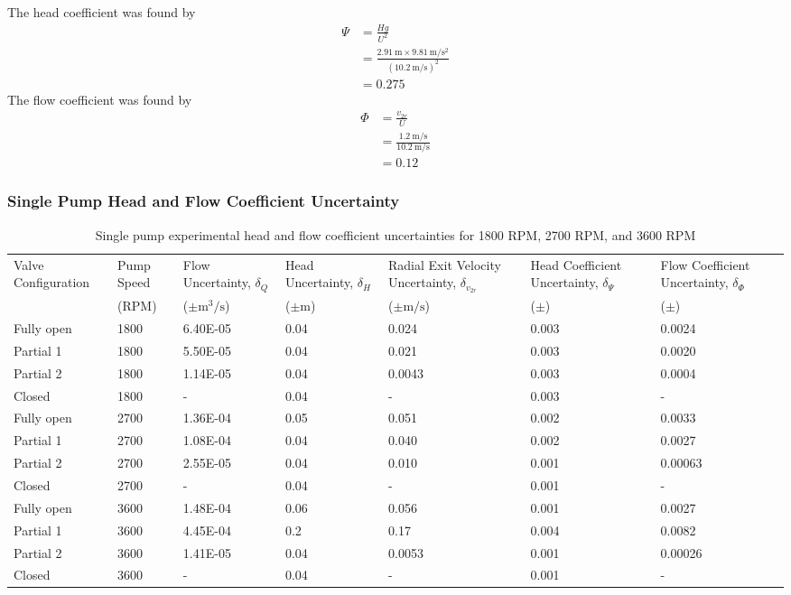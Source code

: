 The head coefficient was found by
\begin{align*}
    \Psi &= \frac{Hg}{U^2} \\
    &= \frac{\qty{2.91}{\meter} \times \qty{9.81}{\meter\per\second\squared}}{(\qty{10.2}{\meter\per\second})^2} \\
    &= 0.275
\end{align*}
The flow coefficient was found by
\begin{align*}
    \Phi &= \frac{v_{2r}}{U} \\
    &= \frac{\qty{1.2}{\meter\per\second}}{\qty{10.2}{\meter\per\second}} \\
    &= 0.12
\end{align*}
\subsubsection{Single Pump Head and Flow Coefficient Uncertainty}
\begin{table}[h]
    \centering
    \caption{Single pump experimental head and flow coefficient uncertainties for 1800 RPM, 2700 RPM, and 3600 RPM}
    \small  
    \begin{tabular}{lC{0.10\textwidth}C{0.10\textwidth}C{0.10\textwidth}C{0.10\textwidth}C{0.10\textwidth}C{0.10\textwidth}}
    \toprule
    Valve Configuration & Pump Speed & Flow Uncertainty, $\delta_Q$ & Head Uncertainty, $\delta_{H}$ & Radial Exit Velocity Uncertainty, $\delta_{v_{2r}}$ & Head Coefficient Uncertainty, $\delta_{\Psi}$ & Flow Coefficient Uncertainty, $\delta_{\Phi}$ \\
    & (RPM) & ($\pm\unit{\meter\cubed\per\second}$) & ($\pm$m) & ($\pm\unit{\meter\per\second}$) & ($\pm$) & ($\pm$) \\
    \midrule
    Fully open & 1800 & 6.40E-05 & 0.04 & 0.024 & 0.003 & 0.0024 \\
    Partial 1 & 1800 & 5.50E-05 & 0.04 & 0.021 & 0.003 & 0.0020 \\
    Partial 2 & 1800 & 1.14E-05 & 0.04 & 0.0043 & 0.003 & 0.0004 \\
    Closed & 1800 & - & 0.04 & - & 0.003 & - \\
    Fully open & 2700 & 1.36E-04 & 0.05 & 0.051 & 0.002 & 0.0033 \\
    Partial 1 & 2700 & 1.08E-04 & 0.04 & 0.040 & 0.002 & 0.0027 \\
    Partial 2 & 2700 & 2.55E-05 & 0.04 & 0.010 & 0.001 & 0.00063 \\
    Closed & 2700 & - & 0.04 & - & 0.001 & - \\
    Fully open & 3600 & 1.48E-04 & 0.06 & 0.056 & 0.001 & 0.0027 \\
    Partial 1 & 3600 & 4.45E-04 & 0.2 & 0.17 & 0.004 & 0.0082 \\
    Partial 2 & 3600 & 1.41E-05 & 0.04 & 0.0053 & 0.001 & 0.00026 \\
    Closed & 3600 & - & 0.04 & - & 0.001 & - \\
    \bottomrule
    \end{tabular}%
\end{table}
